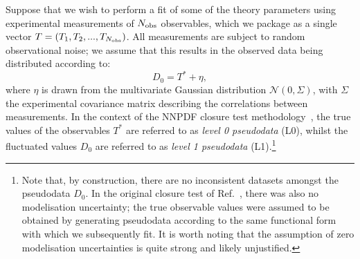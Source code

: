 \documentclass[withindex,glossary]{cam-thesis}
\begin{document}
Suppose that we wish to perform a fit of some of the theory parameters using experimental measurements of $N_{\rm obs}$ observables, which we package as a single vector $T = (T_1, T_2,..., T_{N_{\rm obs}})$. All measurements are subject to random observational noise; we assume that this results in the observed data being distributed according to:
\begin{equation}
\label{eq:observed_data}
D_0 = T^* + \eta,
\end{equation}
where $\eta$ is drawn from the multivariate Gaussian distribution $\mathcal{N}(0,\Sigma)$, with $\Sigma$ the experimental covariance matrix describing the correlations between measurements. In the context of the NNPDF closure test methodology~\cite{NNPDF:2014otw}, the true values of the observables $T^*$ are referred to as \textit{level 0 pseudodata} (L0), whilst the fluctuated values $D_0$ are referred to as \textit{level 1 pseudodata} (L1).\footnote{Note that, by construction, there are no inconsistent
datasets amongst the pseudodata $D_0$. In the original closure test of Ref.~\cite{NNPDF:2014otw}, there was also no modelisation uncertainty; the true observable values were assumed to be obtained by generating pseudodata according to the same functional form with which we subsequently fit. It is worth noting that the assumption of zero modelisation uncertainties
is quite strong and likely unjustified.}  
\end{document}
